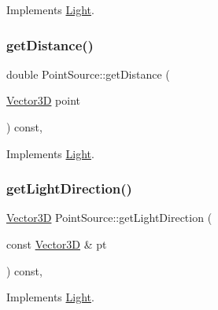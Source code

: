 Implements \mbox{\hyperlink{classLight_af5dc859ada149ca54ec5088e1c33deb4}{Light}}.

\mbox{\label{classPointSource_a5f1af9abccf0657b9398555c935bb8bc}} 
\subsubsection{\texorpdfstring{getDistance()}{getDistance()}}
{\footnotesize\ttfamily double Point\+Source\+::get\+Distance (\begin{DoxyParamCaption}\item[{\mbox{\hyperlink{classVector3D}{Vector3D}}}]{point }\end{DoxyParamCaption}) const\hspace{0.3cm}{\ttfamily [override]}, {\ttfamily [virtual]}}



Implements \mbox{\hyperlink{classLight_a4a7a5a9d4fc67da122c3ce75f6075093}{Light}}.

\mbox{\label{classPointSource_a02a13a7b955088e32324bfb3d49b1ace}} 
\subsubsection{\texorpdfstring{getLightDirection()}{getLightDirection()}}
{\footnotesize\ttfamily \mbox{\hyperlink{classVector3D}{Vector3D}} Point\+Source\+::get\+Light\+Direction (\begin{DoxyParamCaption}\item[{const \mbox{\hyperlink{classVector3D}{Vector3D}} \&}]{pt }\end{DoxyParamCaption}) const\hspace{0.3cm}{\ttfamily [override]}, {\ttfamily [virtual]}}



Implements \mbox{\hyperlink{classLight_ac075908cf22e9ca9f289c1226d133664}{Light}}.

\mbox{\label{classPointSource_a421e0e8d3d1f69aeb095f1f9c39de7e0}} 
